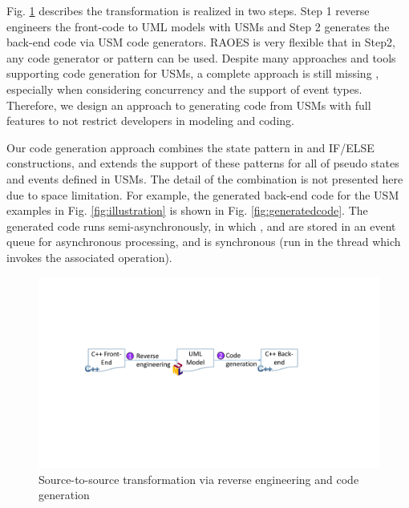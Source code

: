 Fig. \ref{fig:s2stransformation} describes the transformation is realized in two steps.
Step 1 reverse engineers the front-code to UML models with USMs and Step 2 generates the back-end code via USM code generators.
RAOES is very flexible that in Step2, any code generator or pattern can be used. 
Despite many approaches and tools supporting code generation for USMs, a complete approach is still missing \cite{Badreddin2014}, especially when considering concurrency and the support of event types.
Therefore, 
we design an approach to generating code from USMs with full features to not restrict developers in modeling and coding. 

Our code generation approach combines the state pattern in \cite{niaz_mapping_2004} and IF/ELSE constructions, and extends the support of these patterns for all of pseudo states and events defined in USMs.
The detail of the combination is not presented here due to space limitation.
For example, the generated back-end code for the USM examples in Fig. \ref{fig:illustration} is shown in Fig. \ref{fig:generatedcode}. 
The generated code runs semi-asynchronously, in which ,  and  are stored in an event queue for asynchronous processing, and  is synchronous (run in the thread which invokes the associated operation).


\begin{figure}
	\centering
	\includegraphics[clip, trim=4.5cm 9.3cm 7.7cm 7.0cm, width=1.0\columnwidth]{figures/s2stransformation.pdf}
	\caption{Source-to-source transformation via reverse engineering and code generation} 
	\label{fig:s2stransformation}
\end{figure}
